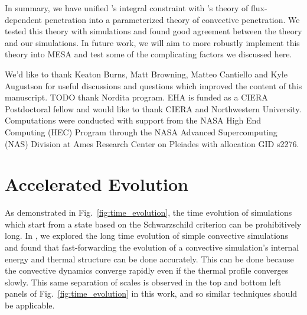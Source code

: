 \documentclass{aastex631}
\begin{document}
In summary, we have unified \citet{roxburgh1989}'s integral constraint with \citet{zahn1991}'s theory of flux-dependent penetration into a parameterized theory of convective penetration.
We tested this theory with simulations and found good agreement between the theory and our simulations.
In future work, we will aim to more robustly implement this theory into MESA and test some of the complicating factors we discussed here.





\begin{acknowledgments}
We'd like to thank Keaton Burns, Matt Browning, Matteo Cantiello and Kyle Augustson for useful discussions and questions which improved the content of this manuscript.
TODO thank Nordita program.
EHA is funded as a CIERA Postdoctoral fellow and would like to thank CIERA and Northwestern University. 
Computations were conducted with support from the NASA High End Computing (HEC) Program through the NASA Advanced Supercomputing (NAS) Division at Ames Research Center on Pleiades with allocation GID s2276.
\end{acknowledgments}


\appendix

\section{Accelerated Evolution}
\label{app:accelerated_evolution}
As demonstrated in Fig.~\ref{fig:time_evolution}, the time evolution of simulations which start from a state based on the Schwarzschild criterion can be prohibitively long.
In \citet{anders_etal_2018}, we explored the long time evolution of simple convective simulations and found that fast-forwarding the evolution of a convective simulation's internal energy and thermal structure can be done accurately.
This can be done because the convective dynamics converge rapidly even if the thermal profile converges slowly.
This same separation of scales is observed in the top and bottom left panels of Fig.~\ref{fig:time_evolution} in this work, and so similar techniques should be applicable.
\end{document}
